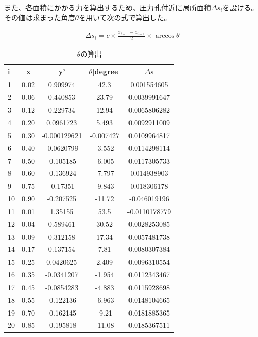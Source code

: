 \documentclass[a4j,twoside,openright,11pt]{jarticle}
\begin{document}
また、各面積にかかる力を算出するため、圧力孔付近に局所面積$\Delta s_i$を設ける。その値は求まった角度$\theta$を用いて次の式で算出した。

\begin{eqnarray}
\Delta s_i = c \times \frac{x_{i+1} - x_{i-1}}{2} \times \arccos \theta
\end{eqnarray}

\begin{table}[htb]
\begin{center}
  \caption{$\theta$の算出}
  \begin{tabular}{|l||c|c|c|c|} \hline
i&x&y'&$\theta$[degree]&$\Delta s$\\\hline
1&0.02&0.909974&42.3&0.001554605\\
2&0.06&0.440853&23.79&0.0039991647\\
3&0.12&0.229734&12.94&0.0065806282\\
4&0.20&0.0961723&5.493&0.0092911009\\
5&0.30&-0.000129621&-0.007427&0.0109964817\\
6&0.40&-0.0620799&-3.552&0.0114298114\\
7&0.50&-0.105185&-6.005&0.0117305733\\
8&0.60&-0.136924&-7.797&0.014938903\\
9&0.75&-0.17351&-9.843&0.018306178\\
10&0.90&-0.207525&-11.72&-0.046019196\\
11&0.01&1.35155&53.5&-0.0110178779\\
12&0.04&0.589461&30.52&0.0028253085\\
13&0.09&0.312158&17.34&0.0057481738\\
14&0.17&0.137154&7.81&0.0080307384\\
15&0.25&0.0420625&2.409&0.0096310554\\
16&0.35&-0.0341207&-1.954&0.0112343467\\
17&0.45&-0.0854283&-4.883&0.0115928698\\
18&0.55&-0.122136&-6.963&0.0148104665\\
19&0.70&-0.162145&-9.21&0.0181885365\\
20&0.85&-0.195818&-11.08&0.0185367511\\
\hline
  \end{tabular}
\end{center}
\end{table}
\end{document}
